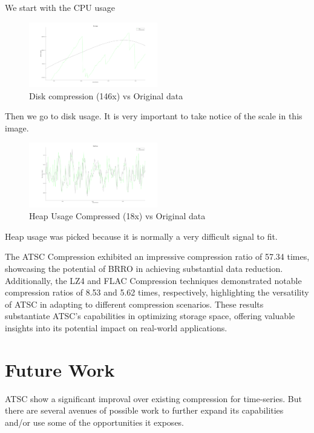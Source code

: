 \documentclass[conference]{IEEEtran}
\begin{document}
We start with the CPU usage

\begin{figure}[h]
    \centering
    \includegraphics[width=0.5\textwidth]{disk-usage-validation.png}
    \caption{Disk compression (146x) vs Original data}
    \label{Disk}
  \end{figure}

Then we go to disk usage. It is very important to take notice of the scale in this image.

  \begin{figure}[h]
    \centering
    \includegraphics[width=0.5\textwidth]{heap-usage-validation.png}
    \caption{Heap Usage Compressed (18x) vs Original data}
    \label{heap}
  \end{figure}
\vspace{10pt}

Heap usage was picked because it is normally a very difficult signal to fit.

The ATSC Compression exhibited an impressive compression ratio of 57.34 times, showcasing the potential of BRRO in achieving substantial data reduction. Additionally, the LZ4 and FLAC Compression techniques demonstrated notable compression ratios of 8.53 and 5.62 times, respectively, highlighting the versatility of ATSC in adapting to different compression scenarios. 
These results substantiate ATSC's capabilities in optimizing storage space, offering valuable insights into its potential impact on real-world applications. 

\section{Future Work}

ATSC show a significant improval over existing compression for time-series. But there are several avenues of possible work to further expand its capabilities and/or use some of the opportunities it exposes.
\end{document}
